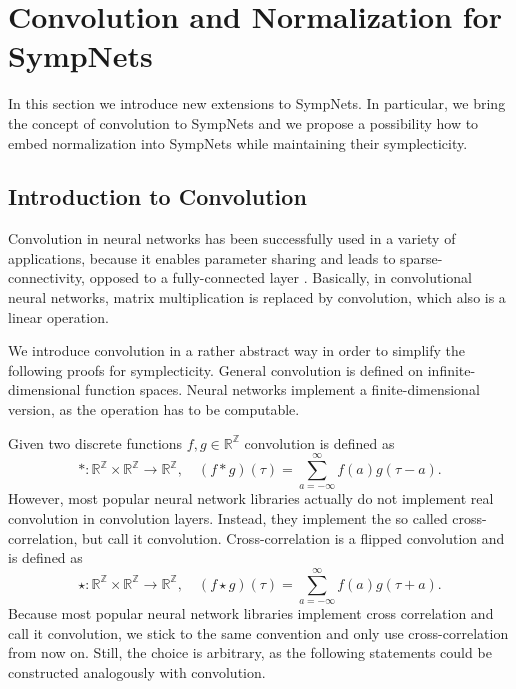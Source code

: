 \documentclass[twoside,a4paper]{article}
\begin{document}
\section{Convolution and Normalization for SympNets}\label{sec_conv_and_norm_for_sympnets}

In this section we introduce new extensions to SympNets. In particular, we bring the concept
of convolution to SympNets and we propose a possibility how to embed normalization into SympNets while
maintaining their symplecticity.

\subsection{Introduction to Convolution}

Convolution in neural networks has been successfully used in a variety of 
applications, because it enables parameter sharing and leads to 
sparse-connectivity, opposed to a fully-connected layer \cite{Goodfellow2016}.
Basically, in convolutional neural networks, matrix multiplication is 
replaced by convolution, which also is a linear operation.

We introduce convolution in a rather abstract way in order to simplify the following proofs
for symplecticity.
General convolution is defined on infinite-dimensional function spaces.
Neural networks implement a finite-dimensional version, as the operation has to be
computable.

Given two discrete functions $f,g \in \mathbb{R}^\mathbb{Z}$ convolution is defined as 
\begin{equation*}
	*: \mathbb{R}^{\mathbb{Z}} \times \mathbb{R}^{\mathbb{Z}} \to \mathbb{R}^{\mathbb{Z}},
	\quad (f*g)(\tau) = \sum^{\infty}_{a=-\infty} f(a) g(\tau - a)
	.
\end{equation*}
However, most popular neural network libraries actually do not implement real convolution
in convolution layers. Instead, they implement the so called cross-correlation, but call it convolution. 
Cross-correlation is a flipped convolution and is defined as
\begin{equation*}
	\star: \mathbb{R}^{\mathbb{Z}} \times \mathbb{R}^{\mathbb{Z}} \to \mathbb{R}^{\mathbb{Z}},
	\quad (f \star g)(\tau) = \sum^{\infty}_{a=-\infty} f(a) g(\tau + a)
	.
\end{equation*}
Because most popular neural network libraries implement cross correlation and call it convolution,
we stick to the same convention and only use cross-correlation from now on.
Still, the choice is arbitrary, as the following statements could be constructed analogously with convolution.
\end{document}
